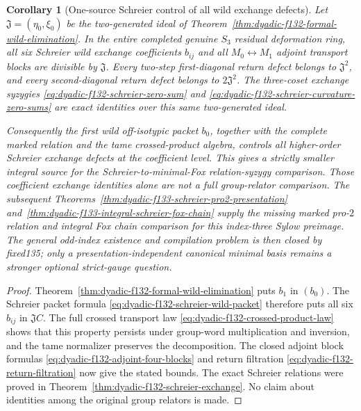 \documentclass[11pt]{article}
\newtheorem{corollary}[theorem]{Corollary}
\theoremstyle{definition}
\begin{document}
\begin{corollary}[One-source Schreier control of all wild exchange defects]
\label{cor:dyadic-f132-one-source-schreier-control}
Let
$\mathfrak J=
(\eta_0,\xi_0)$ be
the two-generated
ideal of
Theorem~\ref{thm:dyadic-f132-formal-wild-elimination}.
In the entire completed
genuine $S_3$
residual deformation
ring, all six
Schreier wild exchange
coefficients $b_{ij}$
and all
$M_0\leftrightarrow M_1$
adjoint transport
blocks are divisible
by $\mathfrak J$.
Every two-step
first-diagonal return
defect belongs to
$\mathfrak J^2$,
and every
second-diagonal
return defect
belongs to
$2\mathfrak J^2$.
The three-coset
exchange syzygies
\eqref{eq:dyadic-f132-schreier-zero-sum}
and
\eqref{eq:dyadic-f132-schreier-curvature-zero-sums}
are exact identities
over this \emph{same}
two-generated ideal.

Consequently the
first wild
off-isotypic packet
$b_0$, together
with the complete
marked relation
and the tame
crossed-product
algebra, controls
all higher-order
Schreier exchange
defects at the
coefficient level.
This gives a
strictly smaller
integral source for the
Schreier-to-minimal-Fox
relation-syzygy comparison.
Those coefficient exchange identities
alone are not a full group-relator comparison.
The subsequent
Theorems~\ref{thm:dyadic-f133-schreier-pro2-presentation}
and~\ref{thm:dyadic-f133-integral-schreier-fox-chain}
supply the missing marked pro-$2$ relation and
integral Fox chain comparison for this index-three
Sylow preimage.  The general odd-index
\emph{existence and compilation} problem is then
closed by fixed135; only a presentation-independent
canonical minimal basis remains a stronger optional
strict-gauge question.
\end{corollary}

\begin{proof}
Theorem~\ref{thm:dyadic-f132-formal-wild-elimination}
puts $b_1$ in
$(b_0)$.
The Schreier
packet formula
\eqref{eq:dyadic-f132-schreier-wild-packet}
therefore puts
all six $b_{ij}$
in $\mathfrak J C$.
The full crossed
transport law
\eqref{eq:dyadic-f132-crossed-product-law}
shows that this
property persists
under group-word
multiplication
and inversion,
and the tame
normalizer
preserves the
decomposition.
The closed adjoint
block formulas
\eqref{eq:dyadic-f132-adjoint-four-blocks}
and return
filtration
\eqref{eq:dyadic-f132-return-filtration}
now give the stated
bounds.
The exact
Schreier relations
were proved in
Theorem~\ref{thm:dyadic-f132-schreier-exchange}.
No claim about
identities among
the original
group relators
is made.
\end{proof}
\end{document}
